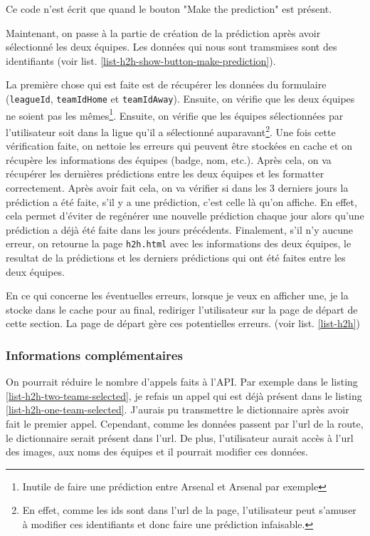 \documentclass[a4paper,14pt]{extarticle}
\begin{document}
{Ce code n'est écrit que quand le bouton "Make the prediction" est présent.

Maintenant, on passe à la partie de création de la prédiction après avoir sélectionné les deux équipes. Les données qui nous sont tramsmises sont des identifiants (voir list. \ref{list-h2h-show-button-make-prediction}).

La première chose qui est faite est de récupérer les données du formulaire (\texttt{leagueId}, \texttt{teamIdHome} et \texttt{teamIdAway}). Ensuite, on vérifie que les deux équipes ne soient pas les mêmes\footnote{Inutile de faire une prédiction entre Arsenal et Arsenal par exemple}. Ensuite, on vérifie que les équipes sélectionnées par l'utilisateur soit dans la ligue qu'il a sélectionné auparavant\footnote{En effet, comme les ids sont dans l'url de la page, l'utilisateur peut s'amuser à modifier ces identifiants et donc faire une prédiction infaisable.}. Une fois cette vérification faite, on nettoie les erreurs qui peuvent être stockées en cache et on récupère les informations des équipes (badge, nom, etc.). Après cela, on va récupérer les dernières prédictions entre les deux équipes et les formatter correctement. Après avoir fait cela, on va vérifier si dans les 3 derniers jours la prédiction a été faite, s'il y a une prédiction, c'est celle là qu'on affiche. En effet, cela permet d'éviter de regénérer une nouvelle prédiction chaque jour alors qu'une prédiction a déjà été faite dans les jours précédents. Finalement, s'il n'y aucune erreur, on retourne la page \texttt{h2h.html} avec les informations des deux équipes, le resultat de la prédictions et les derniers prédictions qui ont été faites entre les deux équipes.


En ce qui concerne les éventuelles erreurs, lorsque je veux en afficher une, je la stocke dans le cache pour au final, rediriger l'utilisateur sur la page de départ de cette section. La page de départ gère ces potentielles erreurs. (voir list. \ref{list-h2h})


\subsubsection{Informations complémentaires}
On pourrait réduire le nombre d'appels faits à l'API. Par exemple dans le listing \ref{list-h2h-two-teams-selected}, je refais un appel qui est déjà présent dans le listing \ref{list-h2h-one-team-selected}. J'aurais pu transmettre le dictionnaire après avoir fait le premier appel. Cependant, comme les données passent par l'url de la route, le dictionnaire serait présent dans l'url. De plus, l'utilisateur aurait accès à l'url des images, aux noms des équipes et il pourrait modifier ces données.

}
\end{document}
